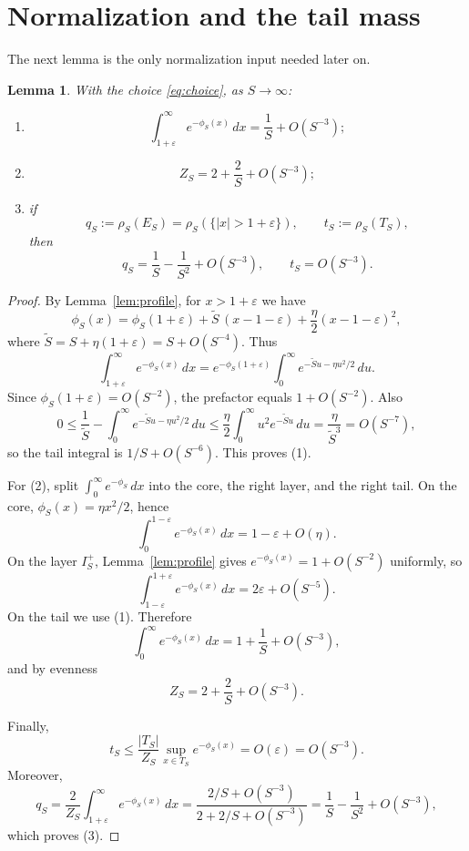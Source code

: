 \documentclass[11pt]{amsart}
\newtheorem{lemma}[theorem]{Lemma}
\theoremstyle{remark}
\begin{document}
\section{Normalization and the tail mass}

The next lemma is the only normalization input needed later on.

\begin{lemma}\label{lem:normalization}
With the choice \eqref{eq:choice}, as $S\to\infty$:
\begin{enumerate}
\item
  \[
    \int_{1+\varepsilon}^{\infty}e^{-\phi_S(x)}\,dx
    =\frac{1}{S}+O(S^{-3});
  \]
\item
  \[
    Z_S=2+\frac{2}{S}+O(S^{-3});
  \]
\item if
  \[
    q_S:=\rho_S(E_S)=\rho_S(\{|x|>1+\varepsilon\}),
    \qquad
    t_S:=\rho_S(T_S),
  \]
  then
  \[
    q_S=\frac{1}{S}-\frac{1}{S^2}+O(S^{-3}),
    \qquad
    t_S=O(S^{-3}).
  \]
\end{enumerate}
\end{lemma}

\begin{proof}
By Lemma~\ref{lem:profile}, for $x>1+\varepsilon$ we have
\[
  \phi_S(x)
  =\phi_S(1+\varepsilon)+\widetilde S\,(x-1-\varepsilon)
   +\frac{\eta}{2}(x-1-\varepsilon)^2,
\]
where $\widetilde S=S+\eta(1+\varepsilon)=S+O(S^{-4})$. Thus
\[
  \int_{1+\varepsilon}^{\infty}e^{-\phi_S(x)}\,dx
  =
  e^{-\phi_S(1+\varepsilon)}
  \int_0^\infty e^{-\widetilde S u-\eta u^2/2}\,du.
\]
Since $\phi_S(1+\varepsilon)=O(S^{-2})$, the prefactor equals
$1+O(S^{-2})$. Also
\[
  0\le \frac{1}{\widetilde S}
  -\int_0^\infty e^{-\widetilde S u-\eta u^2/2}\,du
  \le
  \frac{\eta}{2}\int_0^\infty u^2e^{-\widetilde S u}\,du
  =
  \frac{\eta}{\widetilde S^3}
  =O(S^{-7}),
\]
so the tail integral is $1/S+O(S^{-6})$. This proves (1).

For (2), split $\int_0^\infty e^{-\phi_S}\,dx$ into the core, the right layer,
and the right tail. On the core, $\phi_S(x)=\eta x^2/2$, hence
\[
  \int_0^{1-\varepsilon}e^{-\phi_S(x)}\,dx
  =1-\varepsilon+O(\eta).
\]
On the layer $I_S^+$, Lemma~\ref{lem:profile} gives
$e^{-\phi_S(x)}=1+O(S^{-2})$ uniformly, so
\[
  \int_{1-\varepsilon}^{1+\varepsilon}e^{-\phi_S(x)}\,dx
  =2\varepsilon+O(S^{-5}).
\]
On the tail we use (1). Therefore
\[
  \int_0^\infty e^{-\phi_S(x)}\,dx
  =1+\frac{1}{S}+O(S^{-3}),
\]
and by evenness
\[
  Z_S=2+\frac{2}{S}+O(S^{-3}).
\]

Finally,
\[
  t_S
  \le \frac{|T_S|}{Z_S}\sup_{x\in T_S}e^{-\phi_S(x)}
  =O(\varepsilon)
  =O(S^{-3}).
\]
Moreover,
\[
  q_S
  =\frac{2}{Z_S}\int_{1+\varepsilon}^\infty e^{-\phi_S(x)}\,dx
  =
  \frac{2/S+O(S^{-3})}{2+2/S+O(S^{-3})}
  =
  \frac{1}{S}-\frac{1}{S^2}+O(S^{-3}),
\]
which proves (3).
\end{proof}
\end{document}
